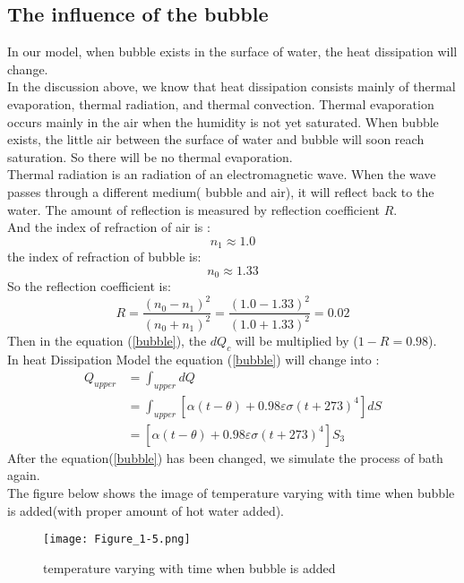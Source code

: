 \documentclass{mcmthesis}
\begin{document}
\subsection{The influence of the bubble}
\indent In our model, when bubble exists in the surface of water, the heat dissipation will change.\\
\indent In the discussion above, we know that heat dissipation consists mainly of thermal evaporation, thermal radiation, and thermal convection. Thermal evaporation occurs mainly in the air when the humidity is not yet saturated. When bubble exists, the little air between the surface of water and bubble will soon reach saturation. So there will be no thermal evaporation.\\
\indent Thermal radiation is an radiation of an electromagnetic wave. When the wave passes through a different medium( bubble and air), it will reflect back to the water. The amount of reflection is measured by reflection coefficient $R$.\\
\indent And the index of refraction of air is :
\begin{equation}
	n_{1}\approx 1.0
\end{equation}
\indent the index of refraction of bubble is: 
\begin{equation}
	 n_{0}\approx 1.33
\end{equation}
\indent So the reflection coefficient is: 
\begin{equation}
	R=\frac{(n_{0}-n_{1})^{2}}{(n_{0}+n_{1})^{2}}=\frac{(1.0-1.33)^{2}}{(1.0+1.33)^2}=0.02
\end{equation}
\indent Then in the equation (\ref{bubble}), the $dQ_{c}$ will be multiplied by ($1-R=0.98$). \\
\indent In heat Dissipation Model the equation (\ref{bubble}) will change into :
\begin{equation}
\begin{split}
	Q_{upper}&=\int_{upper}dQ\\
	&=\int_{upper} [\alpha (t-\theta)+0.98\varepsilon \sigma (t+273)^{4}]dS\\
	&=[\alpha (t-\theta)+0.98\varepsilon \sigma (t+273)^{4}]S_{3} 
	\end{split}
\end{equation} 
\indent After the equation(\ref{bubble}) has been changed, we simulate the process of bath again.\\
\indent The figure below shows the image of temperature varying with time when bubble is added(with proper amount of hot water added).
\begin{figure}[H]
		\centerline{\texttt{[image: Figure\_1-5.png]}}
	\caption{temperature varying with time when bubble is added}
\end{figure}
\end{document}
